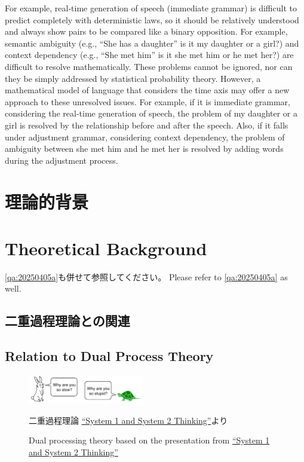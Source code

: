 \documentclass[a4paper,xelatex,ja=standard]{bxjsarticle}
\begin{document}
For example, real-time generation of speech (immediate grammar) is difficult to predict completely with deterministic laws, so it should be relatively understood and always show pairs to be compared like a binary opposition.
For example, semantic ambiguity (e.g., ``She has a daughter'' is it my daughter or a girl?) and context dependency (e.g., ``She met him'' is it she met him or he met her?) are difficult to resolve mathematically.
These problems cannot be ignored, nor can they be simply addressed by statistical probability theory.
However, a mathematical model of language that considers the time axis may offer a new approach to these unresolved issues.
For example, if it is immediate grammar, considering the real-time generation of speech, the problem of my daughter or a girl is resolved by the relationship before and after the speech.
Also, if it falls under adjustment grammar, considering context dependency, the problem of ambiguity between she met him and he met her is resolved by adding words during the adjustment process.
    \fi

\ifJPN
\section{理論的背景}
\else
\section{Theoretical Background}
\fi

\ifJPN
\ref{qa:20250405a}も併せて参照してください。
\else
Please refer to \ref{qa:20250405a} as well.
\fi

\ifJPN
  \subsection{二重過程理論との関連}
\else
  \subsection{Relation to Dual Process Theory}
\fi

\begin{figure}[htb]\centering\small
\includegraphics[width=0.45\textwidth]{./figures/fastslow01.pdf} 
\ifJPN
  \caption{二重過程理論 \href{https://thedecisionlab.com/reference-guide/philosophy/system-1-and-system-2-thinking}{``System 1 and System 2 Thinking''}より}\label{fig:fastslow01-j}
\else
  \caption{Dual processing theory based on the presentation from \href{https://thedecisionlab.com/reference-guide/philosophy/system-1-and-system-2-thinking}{``System 1 and System 2 Thinking''}}\label{fig:fastslow01}
\fi
\end{figure}
\end{document}
